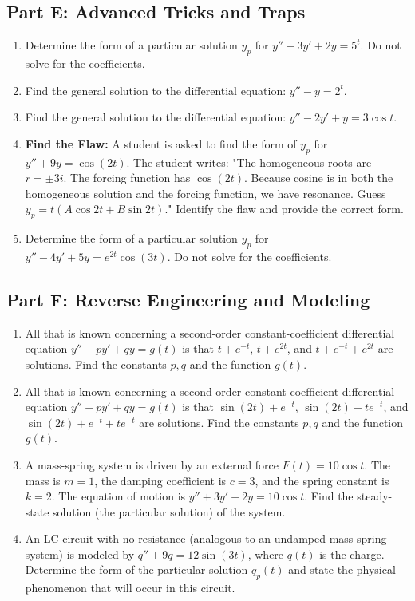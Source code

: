 \documentclass[11pt]{article}
\begin{document}
\subsection*{Part E: Advanced Tricks and Traps}
\begin{enumerate}[resume]
    \item Determine the form of a particular solution $y_p$ for $y'' - 3y' + 2y = 5^t$. Do not solve for the coefficients.
    \item Find the general solution to the differential equation: $y'' - y = 2^t$.
    \item Find the general solution to the differential equation: $y'' - 2y' + y = 3\cos t$.
    \item \textbf{Find the Flaw:} A student is asked to find the form of $y_p$ for $y'' + 9y = \cos(2t)$. The student writes: "The homogeneous roots are $r = \pm 3i$. The forcing function has $\cos(2t)$. Because cosine is in both the homogeneous solution and the forcing function, we have resonance. Guess $y_p = t(A\cos 2t + B\sin 2t)$." Identify the flaw and provide the correct form.
    \item Determine the form of a particular solution $y_p$ for $y'' - 4y' + 5y = e^{2t}\cos(3t)$. Do not solve for the coefficients.
\end{enumerate}

\subsection*{Part F: Reverse Engineering and Modeling}
\begin{enumerate}[resume]
    \item All that is known concerning a second-order constant-coefficient differential equation $y'' + py' + qy = g(t)$ is that $t + e^{-t}$, $t + e^{2t}$, and $t + e^{-t} + e^{2t}$ are solutions. Find the constants $p, q$ and the function $g(t)$.
    \item All that is known concerning a second-order constant-coefficient differential equation $y'' + py' + qy = g(t)$ is that $\sin(2t) + e^{-t}$, $\sin(2t) + te^{-t}$, and $\sin(2t) + e^{-t} + te^{-t}$ are solutions. Find the constants $p, q$ and the function $g(t)$.
    \item A mass-spring system is driven by an external force $F(t) = 10\cos t$. The mass is $m=1$, the damping coefficient is $c=3$, and the spring constant is $k=2$. The equation of motion is $y'' + 3y' + 2y = 10\cos t$. Find the steady-state solution (the particular solution) of the system.
    \item An LC circuit with no resistance (analogous to an undamped mass-spring system) is modeled by $q'' + 9q = 12\sin(3t)$, where $q(t)$ is the charge. Determine the form of the particular solution $q_p(t)$ and state the physical phenomenon that will occur in this circuit.
\end{enumerate}
\end{document}
